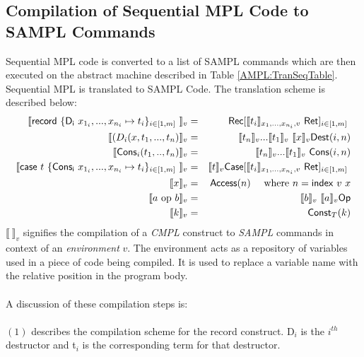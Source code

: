 \documentclass[11pt]{article}
\newcommand{\<}{\langle}
\renewcommand{\>}{\rangle}
\begin{document}
\subsection {Compilation of Sequential MPL Code to SAMPL Commands}
Sequential MPL code is converted to a list of SAMPL commands which are then executed on the abstract machine described in Table \ref {AMPL:TranSeqTable}. Sequential MPL is translated to SAMPL Code. The translation scheme is described below: 
 \begin{eqnarray} 
  \llbracket {\sf record}~\{ {\sf D_i} ~x_{1_i},...,x_{n_i} \mapsto t_i \}_{i \in [1,m]~} \rrbracket_v & = & {\sf Rec}[\llbracket t_i \rrbracket_{x_1,...,x_{n_i},v} ~{\sf Ret}]_{i \in [1,m]~} \\
  \llbracket (D_i(x,t_1,...,t_n) \rrbracket_v & = & \llbracket t_n \rrbracket_v ... \llbracket t_1 \rrbracket_v ~\llbracket x \rrbracket_v {\sf Dest}(i,n) \\
  \llbracket {\sf Cons}_i(t_1,..,t_n) \rrbracket_v & = & \llbracket t_n \rrbracket_v ... \llbracket t_1 \rrbracket_v ~ {\sf Cons}(i,n) \\
  \llbracket {\sf case} ~ t~ \{ {\sf Cons_i} ~x_{1_i},...,x_{n_i} \mapsto t_i \}_{i \in [1,m]~} \rrbracket_v & = & \llbracket t \rrbracket_v {\sf Case} [\llbracket t_i \rrbracket_{x_1,...,x_{n_i},v} ~{\sf Ret}]_{i \in [1,m]~} \\
  \llbracket x \rrbracket_v & = & {\sf Access}(n) ~~~~\mbox{where $n={\sf index}~v~x$} \\
   \llbracket a~{\rm op}~b \rrbracket_v & = & \llbracket b \rrbracket_v ~ \llbracket a \rrbracket_v {\sf Op} \\
    \llbracket k\rrbracket_v & = & {\sf Const}_T(k) 
  \end{eqnarray}
${\llbracket ~\rrbracket}_v$ signifies the compilation of a {\em CMPL} construct to {\em SAMPL} commands in context of an {\em environment} $v$. The environment acts as a repository of variables used in a piece of code being compiled. It is used to replace a variable name with the relative position in the program body.
~~\\~~\\
A discussion of these compilation steps is:
~~\\~~\\
$(1)$ describes the compilation scheme for the {\sf record} construct. {\sf D$_i$} is the $i^{th}$ destructor and {\sf t$_i$} is the corresponding term for that destructor.
~~\\~~\\
\end{document}
